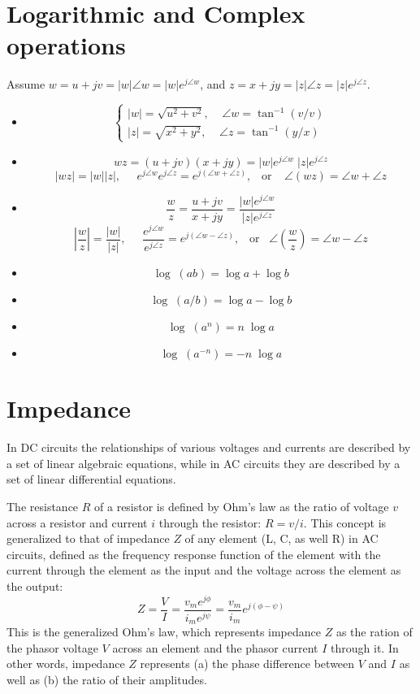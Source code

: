 \usepackage{html}


\section*{Logarithmic and Complex operations}

Assume $w=u+jv=|w|\angle w=|w|e^{j\angle w}$, and $z=x+jy=|z|\angle z=|z|e^{j\angle z}$. 
\begin{itemize}
  \item 
    \[  \left\{ \begin{array}{l}
      |w|=\sqrt{u^2+v^2},\;\;\;\;\angle w=\tan^{-1}\left( v/v \right) \\
      |z|=\sqrt{x^2+y^2},\;\;\;\;\angle z=\tan^{-1}\left( y/x \right) \end{array} \right. \]
  \item 
    \[ w z=(u+jv)(x+jy)=|w|e^{j\angle w}\;|z|e^{j\angle z} \]
    \[ \left| wz \right| =|w||z|,\;\;\;\;\;
    e^{j\angle w} e^{j\angle z}=e^{j(\angle w+\angle z)},
    \;\;\;\mbox{or}\;\;\;\;
    \angle \left( wz \right) =\angle w+\angle z \]
  \item 
    \[ \frac{w}{z}=\frac{u+jv}{x+jy}=\frac{|w|e^{j\angle w}}{|z|e^{j\angle z}} \]
    \[ \left| \frac{w}{z} \right| =\frac{|w|}{|z|},\;\;\;\;\;
    \frac{e^{j\angle w}}{e^{j\angle z}}=e^{j(\angle w-\angle z)},\;\;\;\mbox{or}\;\;\;
    \angle \left( \frac{w}{z} \right)=\angle w-\angle z  \]
\end{itemize}

\begin{itemize}
  \item \[ \log \;(ab)=\log a+\log b \]
  \item \[ \log \;(a/b)=\log a-\log b \]
  \item \[ \log \;(a^n)=n\;\log a \]
  \item \[ \log \;(a^{-n})=-n\;\log a \]
\end{itemize}

\section*{Impedance}

In DC circuits the relationships of various voltages and currents are described 
by a set of linear algebraic equations, while in AC circuits they are described
by a set of linear differential equations. 

The resistance $R$ of a resistor is defined by Ohm's law as the ratio of voltage 
$v$ across a resistor and current $i$ through the resistor: $ R=v/i$.
This concept is generalized to that of impedance $Z$ of any element (L, C, as
well R) in AC circuits, defined as the frequency response function of the element
with the current through the element as the input and the voltage across the element
as the output:
\[
Z=\frac{V}{I}=\frac{v_m e^{j\phi}}{i_m e^{j\psi}}=\frac{v_m}{i_m} e^{j(\phi-\psi)} 
\]
This is the generalized Ohm's law, which represents impedance $Z$ as the ration 
of the phasor voltage $V$ across an element and the phasor current $I$ through it.
In other words, impedance $Z$ represents (a) the phase difference between $V$ and 
$I$ as well as (b) the ratio of their amplitudes.


